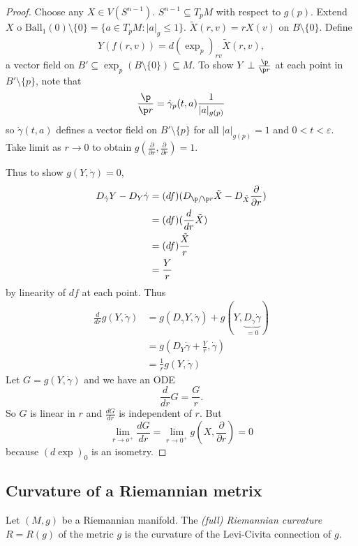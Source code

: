 \documentclass[a4paper]{article}
\begin{document}
\begin{proof}
  Choose any \(X \in V(S^{n - 1})\). \(S^{n - 1} \subseteq T_pM\) with respect to \(g(p)\). Extend \(X\) o \(\text{Ball}_1(0) \setminus \{0\} = \{a \in T_pM: |a|_g \leq 1\}\). \(\tilde X(r, v) = rX(v)\) on \(B \setminus \{0\}\). Define
  \[
    Y(f(r, v)) = d(\exp_p)_{rv} \tilde X(r, v),
  \]
  a vector field on \(B' \subseteq \exp_p(B \setminus \{0\}) \subseteq M\). To show \(Y \perp \frac{\p}{\p r}\) at each point in \(B' \setminus \{p\}\), note that
  \[
    \frac{\p}{\p r} = \dot \gamma_p(t, a) \frac{1}{|a|_{g(p)}}
  \]
  so \(\dot \gamma(t, a)\) defines a vector field on \(B' \setminus \{p\}\) for all \(|a|_{g(p)} = 1\) and \(0 < t < \varepsilon\). Take limit as \(r \to 0\) to obtain \(g(\frac{\partial  }{\partial r}, \frac{\partial  }{\partial r}) = 1\).

  Thus to show \(g(Y, \dot \gamma) = 0\),
  \begin{align*}
    D_{\dot \gamma} Y - D_Y \dot \gamma
    &= (df)(D_{\p/\p r} \tilde X - D_{\tilde X} \frac{\partial  }{\partial r}) \\
    &= (df) (\frac{d}{dr} \tilde X) \\
    &= (df) \frac{\tilde X}{r} \\
    &= \frac{Y}{r}
  \end{align*}
  by linearity of \(df\) at each point. Thus
  \begin{align*}
    \frac{d}{dr} g(Y, \dot \gamma)
    &= g(D_{\dot \gamma} Y, \dot \gamma) + g(Y, \underbrace{D_{\dot \gamma} \dot \gamma}_{= 0}) \\
    &= g(D_Y \dot \gamma + \frac{Y}{r}, \dot \gamma) \\
    &= \frac{1}{r} g(Y, \dot \gamma)
  \end{align*}
  Let \(G = g(Y, \dot \gamma)\) and we have an ODE
  \[
    \frac{d}{dr} G = \frac{G}{r}.
  \]
  So \(G\) is linear in \(r\) and \(\frac{dG}{dr}\) is independent of \(r\). But
  \[
    \lim_{r \to o^+} \frac{dG}{dr} = \lim_{r \to 0^+} g(X, \frac{\partial  }{\partial r}) = 0
  \]
  because \((d \exp)_0\) is an isometry.
\end{proof}

\subsection{Curvature of a Riemannian metrix}

\begin{definition}
  Let \((M, g)\) be a Riemannian manifold. The \emph{(full) Riemannian curvature} \(R = R(g)\) of the metric \(g\) is the curvature of the Levi-Civita connection of \(g\).
\end{definition}
\end{document}
